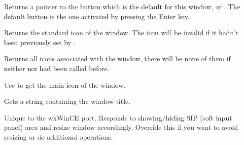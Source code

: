 \label{wxtoplevelwindowgetdefaultitem}


Returns a pointer to the button which is the default for this window, or \NULL.
The default button is the one activated by pressing the Enter key.


\label{wxtoplevelwindowgeticon}


Returns the standard icon of the window. The icon will be invalid if it hadn't
been previously set by .




\label{wxtoplevelwindowgeticons}


Returns all icons associated with the window, there will be none of them if
neither  nor
 had been called before.

Use  to get the main icon of the
window.




\label{wxtoplevelwindowgettitle}


Gets a string containing the window title.




\label{wxtoplevelwindowhandlesettingchange}


Unique to the wxWinCE port. Responds to showing/hiding SIP (soft input panel) area and resize
window accordingly. Override this if you want to avoid resizing or do additional
operations.



